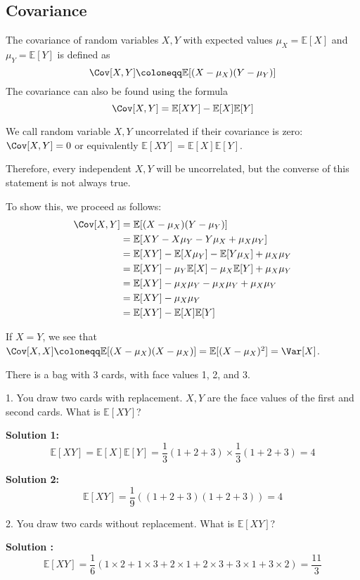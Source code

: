 \subsection{Covariance}

\begin{definition}[Covariance]
    The covariance of random variables \(X, Y\) with expected values \(\mu_X = \mathbb{E}[X]\) and \(\mu_Y = \mathbb{E}[Y]\) is defined as 
    \[
        \Cov[X, Y] \coloneqq \mathbb{E}[(X - \mu_X)(Y - \mu_Y)]
    \]
    The covariance can also be found using the formula 
    \[
        \Cov[X, Y] = \mathbb{E}[XY] - \mathbb{E}[X]\mathbb{E}[Y]
    \]

    \begin{remark}
        We call random variable \(X, Y\) uncorrelated if their covariance is zero: \(\Cov[X, Y] = 0\) or equivalently \(\mathbb{E}[XY] = \mathbb{E}[X]\mathbb{E}[Y]\). 

        Therefore, every independent \(X, Y\) will be uncorrelated, but the converse of this statement is not always true. 
    \end{remark}
\end{definition}

To show this, we proceed as follows:
\[
    \begin{aligned}
        \Cov[X, Y] &= \mathbb{E}[(X - \mu_X)(Y - \mu_Y)] \\
        &= \mathbb{E}[XY - X\mu_Y - Y\mu_X + \mu_X\mu_Y] \\
        &= \mathbb{E}[XY] - \mathbb{E}[X\mu_Y] - \mathbb{E}[Y\mu_X] + \mu_X\mu_Y \\
        &= \mathbb{E}[XY] - \mu_Y\mathbb{E}[X] - \mu_X\mathbb{E}[Y] + \mu_X\mu_Y \\
        &= \mathbb{E}[XY] - \mu_X\mu_Y - \mu_X\mu_Y + \mu_X\mu_Y \\
        &= \mathbb{E}[XY] - \mu_X\mu_Y \\
        &= \mathbb{E}[XY] - \mathbb{E}[X]\mathbb{E}[Y]
    \end{aligned}
\]

If \(X = Y\), we see that \(\Cov[X, X] \coloneqq \mathbb{E}[(X - \mu_X)(X - \mu_X)] = \mathbb{E}[(X - \mu_X)^2] = \Var[X]\).

\begin{eg}
    There is a bag with 3 cards, with face values 1, 2, and 3.
    
    1. You draw two cards with replacement. \(X, Y\) are the face values of the first and second cards. What is \(\mathbb{E}[XY]\)?

    \textbf{Solution 1:} 
    \[
        \mathbb{E}[XY] = \mathbb{E}[X]\mathbb{E}[Y] = \dfrac{1}{3}(1 + 2 + 3) \times \dfrac{1}{3}(1 + 2 + 3) = 4
    \]

    \textbf{Solution 2:} 
    \[
        \mathbb{E}[XY] = \dfrac{1}{9}((1 + 2 + 3)(1 + 2 + 3)) = 4
    \]

    2. You draw two cards without replacement. What is \(\mathbb{E}[XY]\)?

    \textbf{Solution :} 
    \[
        \mathbb{E}[XY] = \dfrac{1}{6}(1 \times 2 + 1 \times 3 + 2 \times 1 + 2 \times 3 + 3 \times 1 + 3 \times 2) = \dfrac{11}{3}
    \]
\end{eg}

